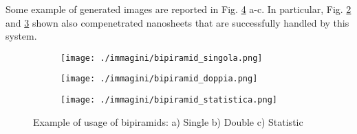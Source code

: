 Some example of generated images are reported in Fig. \ref{fig:bipiramid_type} a-c. In particular, Fig. \ref{fig:bipiramid2} and \ref{fig:bipiramid3} shown also compenetrated nanosheets that are successfully handled by this system.

\begin{figure}[ht]
    \centering
    \begin{subfigure}[b]{0.3\textwidth}
        \texttt{[image: ./immagini/bipiramid\_singola.png]}
        \caption{}
        \label{fig:bipiramid1}
    \end{subfigure}
    \hfill
    \begin{subfigure}[b]{0.3\textwidth}
        \texttt{[image: ./immagini/bipiramid\_doppia.png]}
        \caption{}
        \label{fig:bipiramid2}
    \end{subfigure}
    \hfill
    \begin{subfigure}[b]{0.3\textwidth}
        \texttt{[image: ./immagini/bipiramid\_statistica.png]}
        \caption{}
        \label{fig:bipiramid3}
    \end{subfigure}
    \caption{Example of usage of bipiramids: a) Single b) Double c) Statistic}
    \label{fig:bipiramid_type}
\end{figure}